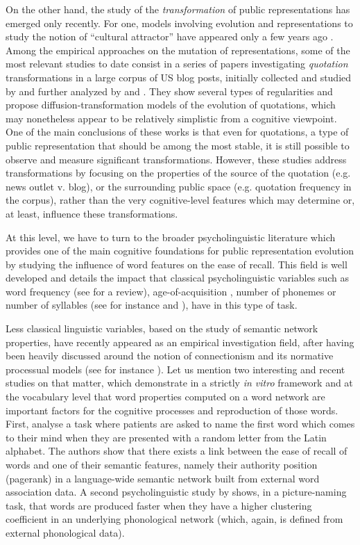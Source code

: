 On the other hand, the study of the \emph{transformation} of public representations has emerged only recently.
For one, models involving evolution and representations to study the notion of ``cultural attractor'' have appeared only a few years ago \citep{Claidiere07}.
Among the empirical approaches on the mutation of representations, some of the most relevant studies to date consist in a series of papers investigating \emph{quotation} transformations in a large corpus of US blog posts, initially collected and studied by \citet{Leskovec09} and further analyzed by \citet{Simmons11} and \citet{omod-mult}.
They show several types of regularities and propose diffusion-transformation models of the evolution of quotations, which may nonetheless appear to be relatively simplistic from a cognitive viewpoint.
One of the main conclusions of these works is that even for quotations, a type of public representation that should be among the most stable, it is still possible to observe and measure significant transformations.
However, these studies address transformations by focusing on the properties of the source of the quotation (e.g. news outlet v. blog), or the surrounding public space (e.g. quotation frequency in the corpus), rather than the very cognitive-level features which may determine or, at least, influence these transformations.

At this level, we have to turn to the broader psycholinguistic literature which provides one of the main cognitive foundations for public representation evolution by studying the influence of word features on the ease of recall.
This field is well developed and details the impact that classical psycholinguistic variables such as word frequency (see \citet{Yonelinas02} for a review), age-of-acquisition \citep{Zevin02}, number of phonemes or number of syllables (see for instance \citet{Rey98} and \citet{nick-diss}), have in this type of task.

Less classical linguistic variables, based on the study of semantic network properties, have recently appeared as an empirical investigation field, after having been heavily discussed around the notion of connectionism and its normative processual models (see for instance \citet{collins1975spreading}).
Let us mention two interesting and recent studies on that matter, which demonstrate in a strictly \emph{in vitro} framework and at the vocabulary level that word properties computed on a word network are important factors for the cognitive processes and reproduction of those words.
First, \citet{Griffiths07} analyse a task where patients are asked to name the first word which comes to their mind when they are presented with a random letter from the Latin alphabet.
The authors show that there exists a link between the ease of recall of words and one of their semantic features, namely their authority position (pagerank) in a language-wide semantic network built from external word association data.
A second psycholinguistic study by \citet{Chan10} shows, in a picture-naming task, that words are produced faster when they have a higher clustering coefficient in an underlying phonological network (which, again, is  defined from external phonological data).

